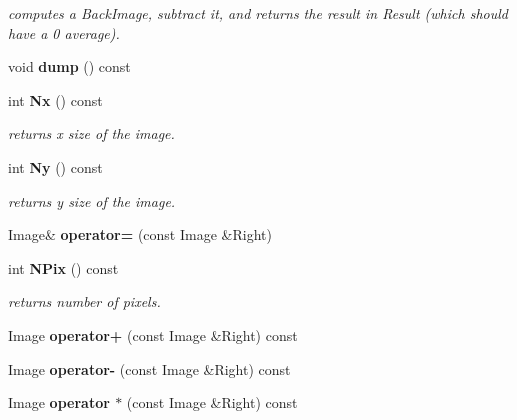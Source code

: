 \begin{CompactItemize}
\begin{CompactList}\small\item\em computes a Back\-Image, subtract it, and returns the result in Result (which should have a 0 average).\item\end{CompactList}\item 
{}
void {\bf dump} () const\label{class_image_a21}

\item 
{}
int {\bf Nx} () const\label{class_image_a22}

\begin{CompactList}\small\item\em returns x size of the image.\item\end{CompactList}\item 
{}
int {\bf Ny} () const\label{class_image_a23}

\begin{CompactList}\small\item\em returns y size of the image.\item\end{CompactList}\item 
{}
Image\& {\bf operator=} (const Image \&Right)\label{class_image_a24}

\item 
{}
int {\bf NPix} () const\label{class_image_a25}

\begin{CompactList}\small\item\em returns number of pixels.\item\end{CompactList}\item 
{}
Image {\bf operator+} (const Image \&Right) const\label{class_image_a26}

\item 
{}
Image {\bf operator-} (const Image \&Right) const\label{class_image_a27}

\item 
{}
Image {\bf operator $\ast$} (const Image \&Right) const\label{class_image_a28}


\end{CompactItemize}
